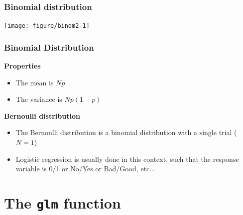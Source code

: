 \documentclass[color=usenames,dvipsnames]{beamer}\usepackage[]{graphicx}\usepackage[]{color}
\newenvironment{knitrout}{}{} %
\begin{document}
\begin{frame}[fragile]
  \frametitle{Binomial distribution}%
  \vspace{-0.4cm}
\begin{center}
\begin{knitrout}
\color{fgcolor}
\texttt{[image: figure/binom2-1]} 

\end{knitrout}
\end{center}
\end{frame}




\begin{frame}
  \frametitle{Binomial Distribution}
  {\bf Properties}
  \begin{itemize}
    \item The mean is $Np$
    \item The variance is $Np(1-p)$
  \end{itemize}
  \pause
  \vfill
  {\bf Bernoulli distribution}
  \begin{itemize}
    \item The Bernoulli distribution is a binomial distribution with a
      single trial ($N=1$)
    \item Logistic regression is usually done in this context, such
      that the response variable is 0/1 or No/Yes or Bad/Good, etc$\dots$
  \end{itemize}
\end{frame}


\section{The {\tt glm} function}
\end{document}
